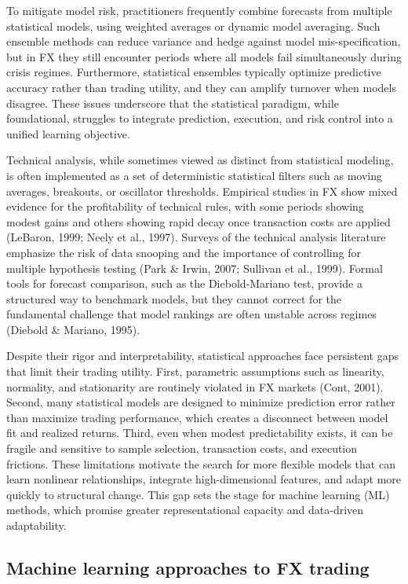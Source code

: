 \documentclass[12pt,a4paper]{article}
\begin{document}
To mitigate model risk, practitioners frequently combine forecasts from multiple statistical models, using weighted averages or dynamic model averaging. Such ensemble methods can reduce variance and hedge against model mis-specification, but in FX they still encounter periods where all models fail simultaneously during crisis regimes. Furthermore, statistical ensembles typically optimize predictive accuracy rather than trading utility, and they can amplify turnover when models disagree. These issues underscore that the statistical paradigm, while foundational, struggles to integrate prediction, execution, and risk control into a unified learning objective.

Technical analysis, while sometimes viewed as distinct from statistical modeling, is often implemented as a set of deterministic statistical filters such as moving averages, breakouts, or oscillator thresholds. Empirical studies in FX show mixed evidence for the profitability of technical rules, with some periods showing modest gains and others showing rapid decay once transaction costs are applied (LeBaron, 1999; Neely et al., 1997). Surveys of the technical analysis literature emphasize the risk of data snooping and the importance of controlling for multiple hypothesis testing (Park \& Irwin, 2007; Sullivan et al., 1999). Formal tools for forecast comparison, such as the Diebold-Mariano test, provide a structured way to benchmark models, but they cannot correct for the fundamental challenge that model rankings are often unstable across regimes (Diebold \& Mariano, 1995).

Despite their rigor and interpretability, statistical approaches face persistent gaps that limit their trading utility. First, parametric assumptions such as linearity, normality, and stationarity are routinely violated in FX markets (Cont, 2001). Second, many statistical models are designed to minimize prediction error rather than maximize trading performance, which creates a disconnect between model fit and realized returns. Third, even when modest predictability exists, it can be fragile and sensitive to sample selection, transaction costs, and execution frictions. These limitations motivate the search for more flexible models that can learn nonlinear relationships, integrate high-dimensional features, and adapt more quickly to structural change. This gap sets the stage for machine learning (ML) methods, which promise greater representational capacity and data-driven adaptability.

\subsection{Machine learning approaches to FX trading}
\end{document}
